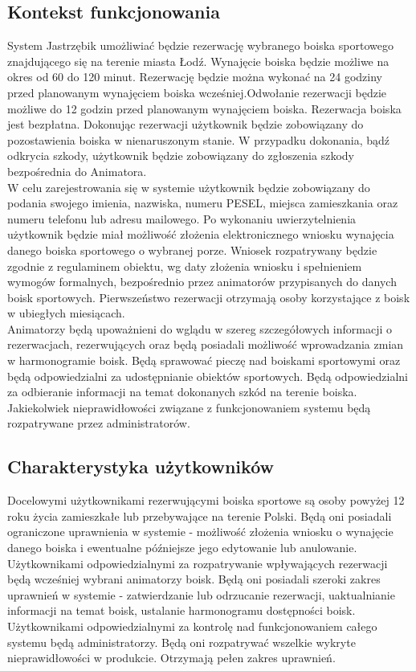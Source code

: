 \documentclass[a4paper,11pt]{article}
\begin{document}
\subsection {Kontekst funkcjonowania}
System Jastrzębik umożliwiać będzie rezerwację wybranego boiska sportowego znajdującego się na terenie miasta Łodź. Wynajęcie boiska będzie możliwe na okres od 60 do 120 minut. Rezerwację będzie można wykonać na 24 godziny przed planowanym wynajęciem boiska wcześniej.Odwołanie rezerwacji  będzie możliwe do 12 godzin przed planowanym wynajęciem boiska. Rezerwacja boiska jest bezpłatna. Dokonując rezerwacji użytkownik będzie zobowiązany do pozostawienia boiska w nienaruszonym stanie. W przypadku dokonania, bądź odkrycia szkody, użytkownik będzie zobowiązany do zgłoszenia szkody bezpośrednia do Animatora. 
\\\indent W celu zarejestrowania się w systemie użytkownik będzie zobowiązany do podania swojego imienia, nazwiska, numeru PESEL, miejsca zamieszkania oraz numeru telefonu lub adresu mailowego. Po wykonaniu uwierzytelnienia użytkownik będzie miał możliwość złożenia elektronicznego wniosku wynajęcia danego boiska sportowego o wybranej porze. Wniosek rozpatrywany będzie zgodnie z regulaminem obiektu, wg daty złożenia wniosku i spełnieniem wymogów formalnych, bezpośrednio przez animatorów przypisanych do danych boisk sportowych. Pierwszeństwo rezerwacji otrzymają osoby korzystające z boisk w ubiegłych miesiącach. 
\\\indent Animatorzy będą upoważnieni do wglądu w szereg szczegółowych informacji o rezerwacjach, rezerwujących oraz będą posiadali możliwość wprowadzania zmian w harmonogramie boisk. Będą sprawować pieczę nad boiskami sportowymi oraz będą odpowiedzialni za udostępnianie obiektów sportowych. Będą odpowiedzialni za odbieranie informacji na temat dokonanych szkód na terenie boiska.
\\\indent Jakiekolwiek nieprawidłowości związane z funkcjonowaniem systemu będą rozpatrywane przez administratorów. 

\subsection {Charakterystyka użytkowników}
Docelowymi użytkownikami rezerwującymi boiska sportowe są osoby powyżej 12 roku życia zamieszkałe lub przebywające na terenie Polski. Będą oni posiadali ograniczone uprawnienia w systemie - możliwość złożenia wniosku o wynajęcie danego boiska i ewentualne późniejsze jego edytowanie lub anulowanie.
\\\indent
Użytkownikami odpowiedzialnymi za rozpatrywanie wpływających rezerwacji będą wcześniej wybrani animatorzy boisk. Będą oni posiadali szeroki zakres uprawnień w systemie - zatwierdzanie lub odrzucanie rezerwacji, uaktualnianie informacji na temat boisk, ustalanie harmonogramu dostępności boisk.
\\\indent Użytkownikami odpowiedzialnymi za kontrolę nad funkcjonowaniem całego systemu będą administratorzy. Będą oni rozpatrywać wszelkie wykryte nieprawidłowości w produkcie. Otrzymają pełen zakres uprawnień.
\end{document}

